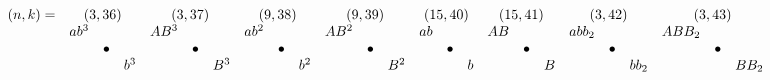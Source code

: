 \documentclass{article}
\begin{document}
\(
\begin{array}{crclrclrclrclrclrclrclrcl}
  (n,k)= & \multicolumn{3}{c}{(3,36)} & \multicolumn{3}{c}{(3,37)} & \multicolumn{3}{c}{(9,38)} & \multicolumn{3}{c}{(9,39)} & \multicolumn{3}{c}{(15,40)} & \multicolumn{3}{c}{(15,41)} & \multicolumn{3}{c}{(3,42)} & \multicolumn{3}{c}{(3,43)} \\
  & ab^3 & & & AB^3 & & & ab^2 & & & AB^2 & & & ab & & & AB & & & abb_2 & & & ABB_2 & & \\
  & & \bullet & & & \bullet & & & \bullet & & & \bullet & & & \bullet & & & \bullet & & & \bullet & & & \bullet & \\
  & & & b^3 & & & B^3 & & & b^2& & & B^2 & & & b & & & B & & & bb_2& & & BB_2 
\end{array}
\)\\
\end{document}

